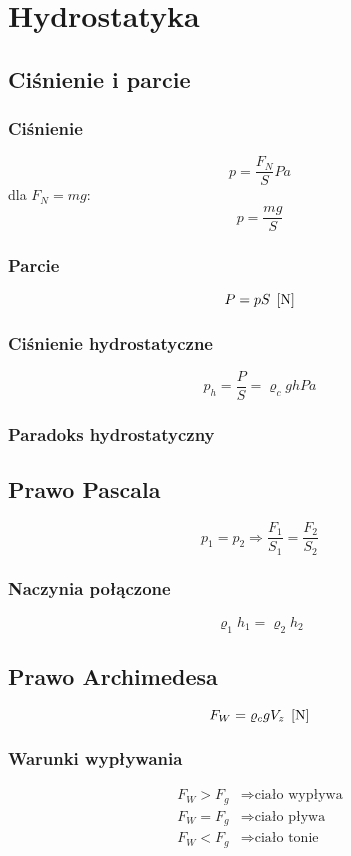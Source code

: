 \chapter{Hydrostatyka}

\section{Ciśnienie i parcie}

\subsection{Ciśnienie}
\begin{equation}
  p = \frac{F_N}{S} \unit{Pa}
\end{equation}
dla $F_N = m g$:
\begin{equation}
  p = \frac{m g}{S}
\end{equation}

\subsection{Parcie}
\begin{equation*}
  P = pS \;\left[\mathrm{N}\right]
\end{equation*}

\subsection{Ciśnienie hydrostatyczne}
\begin{equation*}
  p_h = \frac P S = \varrho_c gh \unit{Pa}
\end{equation*}

\subsection{Paradoks hydrostatyczny}

\section{Prawo Pascala}
\begin{equation}
  p_1 = p_2 \Rightarrow \frac{F_1}{S_1} = \frac{F_2}{S_2}
\end{equation}

\subsection{Naczynia połączone}
\begin{equation*}
  \varrho_1 h_1 = \varrho_2 h_2
\end{equation*}

\section{Prawo Archimedesa}
\begin{equation}
  F_W = \varrho_c g V_z \;\left[\mathrm{N}\right]
\end{equation}

\subsection{Warunki wypływania}
\begin{align*}
  F_W > F_g &\Rightarrow \text{ciało wypływa}\\
  F_W = F_g &\Rightarrow \text{ciało pływa}\\
  F_W < F_g &\Rightarrow \text{ciało tonie}
\end{align*}
